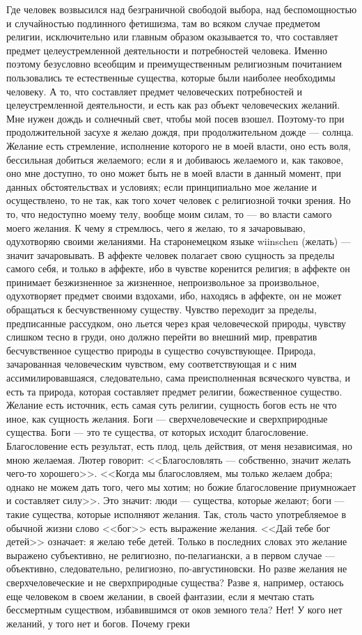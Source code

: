 \documentclass[12pt]{article}
\begin{document}
Где человек возвысился над безграничной свободой выбора, над беспомощностью и случайностью подлинного фетишизма, там во всяком случае предметом религии, исключительно или главным образом оказывается то, что составляет предмет целеустремленной деятельности и потребностей человека. Именно поэтому безусловно всеобщим и преимущественным религиозным почитанием пользовались те естественные существа, которые были наиболее необходимы человеку. А то, что составляет предмет человеческих потребностей и целеустремленной деятельности, и есть как раз объект человеческих желаний. Мне нужен дождь и солнечный свет, чтобы мой посев взошел. Поэтому-то при продолжительной засухе я желаю дождя, при продолжительном дожде --- солнца. Желание есть стремление, исполнение которого не в моей власти, оно есть воля, бессильная добиться желаемого; если я и добиваюсь желаемого и, как таковое, оно мне доступно, то оно может быть не в моей власти в данный момент, при данных обстоятельствах и условиях; если принципиально мое желание и осуществлено, то не так, как того хочет человек с религиозной точки зрения. Но то, что недоступно моему телу, вообще моим силам, то --- во власти самого моего желания. К чему я стремлюсь, чего я желаю, то я зачаровываю, одухотворяю своими желаниями. На старонемецком языке wiinschen (желать) --- значит зачаровывать. В аффекте человек полагает свою сущность за пределы самого себя, и только в аффекте, ибо в чувстве коренится религия; в аффекте он принимает безжизненное за жизненное, непроизвольное за произвольное, одухотворяет предмет своими вздохами, ибо, находясь в аффекте, он не может обращаться к бесчувственному существу. Чувство переходит за пределы, предписанные рассудком, оно льется через края человеческой природы, чувству слишком тесно в груди, оно должно перейти во внешний мир, превратив бесчувственное существо природы в существо сочувствующее. Природа, зачарованная человеческим чувством, ему соответствующая и с ним ассимилировавшаяся, следовательно, сама преисполненная всяческого чувства, и есть та природа, которая составляет предмет религии, божественное существо. Желание есть источник, есть самая суть религии, сущность богов есть не что иное, как сущность желания. Боги --- сверхчеловеческие и сверхприродные существа. Боги --- это те существа, от которых исходит благословение. Благословение есть результат, есть плод, цель действия, от меня независимая, но мною желаемая. Лютер говорит: <<Благословлять --- собственно, значит желать чего-то хорошего>>. <<Когда мы благословляем, мы только желаем добра; однако не можем дать того, чего мы хотим; но божие благословение приумножает и составляет силу>>. Это значит: люди --- существа, которые желают; боги --- такие существа, которые исполняют желания. Так, столь часто употребляемое в обычной жизни слово <<бог>> есть выражение желания. <<Дай тебе бог детей>> означает: я желаю тебе детей. Только в последних словах это желание выражено субъективно, не религиозно, по-пелагиански, а в первом случае --- объективно, следовательно, религиозно, по-августиновски. Но разве желания не сверхчеловеческие и не сверхприродные существа? Разве я, например, остаюсь еще человеком в своем желании, в своей фантазии, если я мечтаю стать бессмертным существом, избавившимся от оков земного тела? Нет! У кого нет желаний, у того нет и богов. Почему греки 
\end{document}
